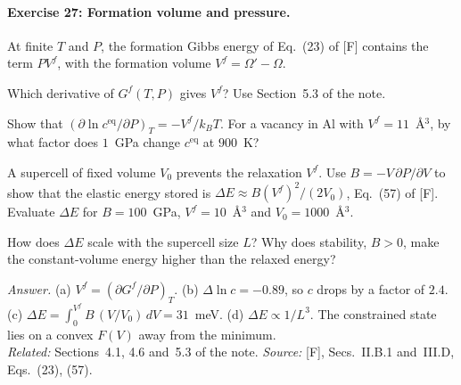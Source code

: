 \documentclass[11pt]{article}      %
\numberwithin{equation}{section}   %
\begin{document}
\paragraph{Exercise 27: Formation volume and pressure.}
At finite $T$ and $P$, the formation Gibbs energy of Eq.~(23) of [F] contains the term $PV^f$, with the formation volume $V^f = \Omega' - \Omega$.
\begin{parts}
    \item Which derivative of $G^f(T, P)$ gives $V^f$? Use Section~5.3 of the note.
    \item Show that $(\partial\ln c^{\text{eq}}/\partial P)_T = -V^f/k_BT$. For a vacancy in Al with $V^f = 11$~\AA$^3$, by what factor does $1$~GPa change $c^{\text{eq}}$ at $900$~K?
    \item A supercell of fixed volume $V_0$ prevents the relaxation $V^f$. Use $B = -V\,\partial P/\partial V$ to show that the elastic energy stored is $\Delta E \approx B(V^f)^2/(2V_0)$, Eq.~(57) of [F]. Evaluate $\Delta E$ for $B = 100$~GPa, $V^f = 10$~\AA$^3$ and $V_0 = 1000$~\AA$^3$.
    \item How does $\Delta E$ scale with the supercell size $L$? Why does stability, $B > 0$, make the constant-volume energy higher than the relaxed energy?
\end{parts}
\textit{Answer.} (a) $V^f = (\partial G^f/\partial P)_T$. (b) $\Delta\ln c = -0.89$, so $c$ drops by a factor of $2.4$. (c) $\Delta E = \int_0^{V^f}B\,(V/V_0)\,dV = 31$~meV. (d) $\Delta E \propto 1/L^3$. The constrained state lies on a convex $F(V)$ away from the minimum.\\
\textit{Related:} Sections~4.1, 4.6 and~5.3 of the note. \textit{Source:} [F], Secs.~II.B.1 and~III.D, Eqs.~(23), (57).
\end{document}
